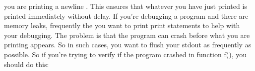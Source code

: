 you are printing a newline . This ensures that whatever you have just printed is printed immediately without delay. If you're debugging a program and there are memory leaks, frequently the you want to print print statements to help with your debugging. The problem is that the program can crash before what you are printing appears. So in such cases, you want to flush your stdout as frequently as possible. So if you're trying to verify if the program crashed in function f(), you should do this:

\\
\\
\\


